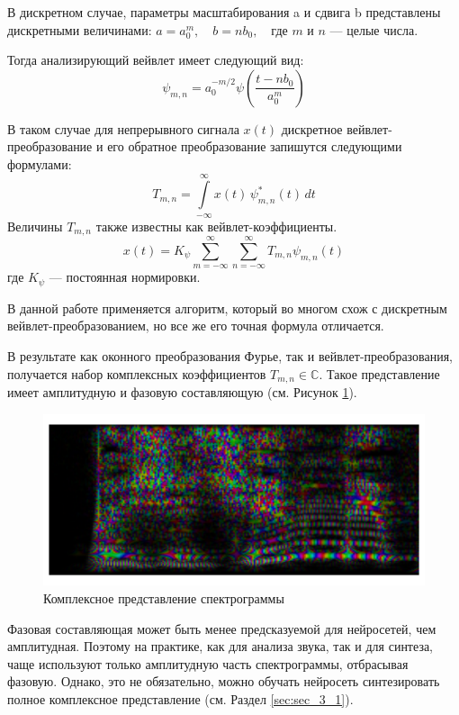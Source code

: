 В дискретном случае, параметры масштабирования a и сдвига b представлены дискретными величинами: $a=a_{0}^{m},\quad b=nb_{0},\quad$где $m$ и $n$ — целые числа.

Тогда анализирующий вейвлет имеет следующий вид:
\begin{equation}
  \psi _{m,n}=a_{0}^{-m/2}\psi \left({\frac {t-nb_{0}}{a_{0}^{m}}}\right)
\end{equation}

В таком случае для непрерывного сигнала $x(t)$ дискретное вейвлет-преобразование и его обратное преобразование запишутся следующими формулами:
\begin{equation}
  T_{m,n}=\int \limits _{-\infty }^{\infty }x(t)\,\psi _{m,n}^{*}(t)\,dt
\end{equation}
Величины $T_{m,n}$ также известны как вейвлет-коэффициенты.
\begin{equation}
  x(t)=K_{\psi }\sum \limits _{m=-\infty }^{\infty }\sum \limits _{n=-\infty }^{\infty }T_{m,n}\psi _{m,n}(t)
\end{equation}
где $K_{\psi }$ — постоянная нормировки.

В данной работе применяется алгоритм, который во многом схож с дискретным вейвлет-преобразованием, но все же его точная формула отличается.


В результате как оконного преобразования Фурье, так и вейвлет-преобразования, получается набор комплексных коэффициентов $T_{m,n} \in \mathbb{C}$. 
Такое представление имеет амплитудную и фазовую составляющую (см. Рисунок \ref{fig:complex_spec}). 

\begin{figure}
  \centering
  \includegraphics[width=0.9\linewidth]{figures/complex_spec}
  \caption{Комплексное представление спектрограммы}
  \label{fig:complex_spec}
\end{figure}

Фазовая составляющая может быть менее предсказуемой для нейросетей, чем амплитудная.
Поэтому на практике, как для анализа звука, так и для синтеза, чаще используют только амплитудную часть спектрограммы, отбрасывая фазовую.
Однако, это не обязательно, можно обучать нейросеть синтезировать полное комплексное представление (см. Раздел \ref{sec:sec_3_1}).


